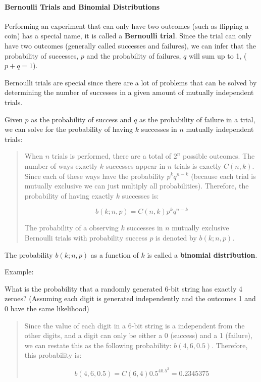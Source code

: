 \hypertarget{bernoulli-trials-and-binomial-distributions}{%
\paragraph{Bernoulli Trials and Binomial
Distributions}\label{bernoulli-trials-and-binomial-distributions}}

Performing an experiment that can only have two outcomes (such as
flipping a coin) has a special name, it is called a \textbf{Bernoulli
trial}. Since the trial can only have two outcomes (generally called
successes and failures), we can infer that the probability of successes,
\textbf{\(p\)} and the probability of failures, \textbf{\(q\)} will sum
up to 1, (\(p+q=1\)).

Bernoulli trials are special since there are a lot of problems that can
be solved by determining the number of successes in a given amount of
mutually independent trials.

Given \textbf{\(p\)} as the probability of success and \textbf{\(q\)} as
the probability of failure in a trial, we can solve for the probability
of having \textbf{\(k\)} successes in \textbf{\(n\)} mutually
independent trials:

\begin{quote}
When \textbf{\(n\)} trials is performed, there are a total of
\textbf{\(2^n\)} possible outcomes. The number of ways exactly
\textbf{\(k\)} successes appear in \textbf{\(n\)} trials is exactly
\textbf{\(C(n,k)\)}. Since each of these ways have the probability
\textbf{\(p^k q^{n-k}\)} (because each trial is mutually exclusive we
can just multiply all probabilities). Therefore, the probability of
having exactly \textbf{\(k\)} successes is:

\[
b(k;n,p)=C(n,k)p^k q^{n-k}
\]

The probability of a observing \textbf{\(k\)} successes in
\textbf{\(n\)} mutually exclusive Bernoulli trials with probability
success \textbf{\(p\)} is denoted by \textbf{\(b(k;n,p)\)}.
\end{quote}

The probability \textbf{\(b(k;n,p)\)} as a function of \textbf{\(k\)} is
called a \textbf{binomial distribution}.

Example:

What is the probability that a randomly generated 6-bit string has
exactly 4 zeroes? (Assuming each digit is generated independently and
the outcomes 1 and 0 have the same likelihood)

\begin{quote}
Since the value of each digit in a 6-bit string is a independent from
the other digits, and a digit can only be either a 0 (success) and a 1
(failure), we can restate this as the following probability:
\textbf{\(b(4,6,0.5)\)}. Therefore, this probability is:

\[
b(4,6,0.5)=C(6,4)0.5^40.5^2=0.2345375
\]
\end{quote}

